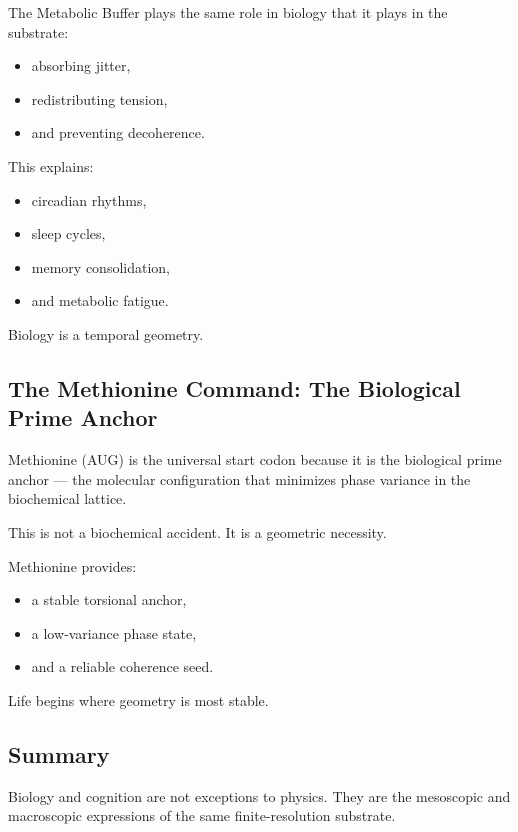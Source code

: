 \documentclass[reprint,amsmath,amssymb,aps,prl,floatfix]{revtex4-2}
\begin{document}
\begin{itemize}
The Metabolic Buffer plays the same role in biology that it plays in the substrate:

\begin{itemize}
\item absorbing jitter,  
\item redistributing tension,  
\item and preventing decoherence.
\end{itemize}
\medskip

This explains:

\begin{itemize}
\item circadian rhythms,  
\item sleep cycles,  
\item memory consolidation,  
\item and metabolic fatigue.
\end{itemize}
\medskip

Biology is a temporal geometry.

\subsection{The Methionine Command: The Biological Prime Anchor}

Methionine (AUG) is the universal start codon because it is the biological prime anchor — the molecular configuration that minimizes phase variance in the biochemical lattice.
\medskip

This is not a biochemical accident.  
It is a geometric necessity.

Methionine provides:

\begin{itemize}
\item a stable torsional anchor,  
\item a low‑variance phase state,  
\item and a reliable coherence seed.
\end{itemize}
\medskip

Life begins where geometry is most stable.

\subsection{Summary}

Biology and cognition are not exceptions to physics.  
They are the mesoscopic and macroscopic expressions of the same finite‑resolution substrate.


\end{itemize}
\end{document}
